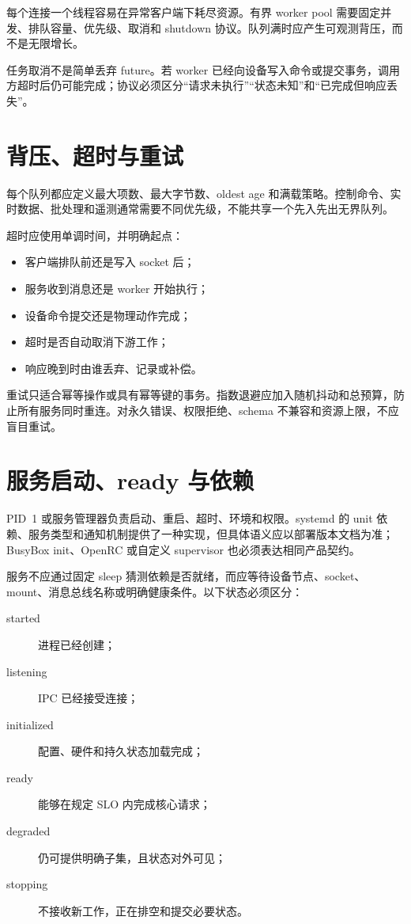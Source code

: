 每个连接一个线程容易在异常客户端下耗尽资源。有界 worker pool 需要固定并发、排队容量、优先级、取消和 shutdown 协议。队列满时应产生可观测背压，而不是无限增长。

任务取消不是简单丢弃 future。若 worker 已经向设备写入命令或提交事务，调用方超时后仍可能完成；协议必须区分“请求未执行”“状态未知”和“已完成但响应丢失”。

\section{背压、超时与重试}

每个队列都应定义最大项数、最大字节数、oldest age 和满载策略。控制命令、实时数据、批处理和遥测通常需要不同优先级，不能共享一个先入先出无界队列。

超时应使用单调时间，并明确起点：

\begin{itemize}
  \item 客户端排队前还是写入 socket 后；
  \item 服务收到消息还是 worker 开始执行；
  \item 设备命令提交还是物理动作完成；
  \item 超时是否自动取消下游工作；
  \item 响应晚到时由谁丢弃、记录或补偿。
\end{itemize}

重试只适合幂等操作或具有幂等键的事务。指数退避应加入随机抖动和总预算，防止所有服务同时重连。对永久错误、权限拒绝、schema 不兼容和资源上限，不应盲目重试。

\section{服务启动、ready 与依赖}

PID~1 或服务管理器负责启动、重启、超时、环境和权限。systemd 的 unit 依赖、服务类型和通知机制提供了一种实现，但具体语义应以部署版本文档为准\cite{systemd-service-man}；BusyBox init、OpenRC 或自定义 supervisor 也必须表达相同产品契约。

服务不应通过固定 sleep 猜测依赖是否就绪，而应等待设备节点、socket、mount、消息总线名称或明确健康条件。以下状态必须区分：

\begin{description}
  \item[started] 进程已经创建；
  \item[listening] IPC 已经接受连接；
  \item[initialized] 配置、硬件和持久状态加载完成；
  \item[ready] 能够在规定 SLO 内完成核心请求；
  \item[degraded] 仍可提供明确子集，且状态对外可见；
  \item[stopping] 不接收新工作，正在排空和提交必要状态。
\end{description}

